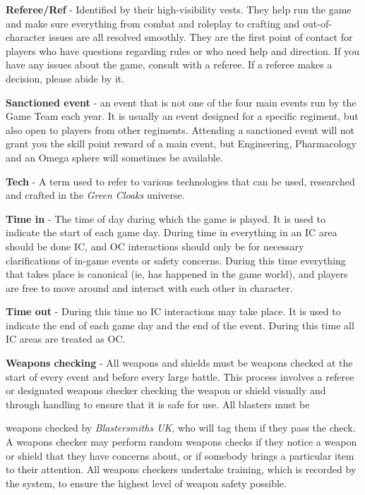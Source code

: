 \documentclass{scrbook}
\begin{document}
\textbf{Referee/Ref} - Identified by their high-visibility vests. They help run the game and make sure everything from combat and roleplay to crafting and out-of-character issues are all resolved smoothly. They are the first point of contact for players who have questions regarding rules or who need help and direction. If you have any issues about the game, consult with a referee. If a referee makes a decision, please abide by it.

\textbf{Sanctioned event} - an event that is not one of the four main events run by the Game Team each year. It is usually an event designed for a specific regiment, but also open to players from other regiments. Attending a sanctioned event will not grant you the skill point reward of a main event, but Engineering, Pharmacology and an Omega sphere will sometimes be available.

\textbf{Tech} - A term used to refer to various technologies that can be used, researched and crafted in the \textit{Green Cloaks} universe.

\textbf{Time in} - The time of day during which the game is played. It is used to indicate the start of each game day. During time in everything in an IC area should be done IC, and OC interactions should only be for necessary clarifications of in-game events or safety concerns. During this time everything that takes place is canonical (ie, has happened in the game world), and players are free to move around and interact with each other in character.

\textbf{Time out} - During this time no IC interactions may take place. It is used to indicate the end of each game day and the end of the event. During this time all IC areas are treated as OC.

\textbf{Weapons checking} - All weapons and shields must be weapons checked at the start of every event and before every large battle. This process involves a referee or designated weapons checker checking the weapon or shield visually and through handling to ensure that it is safe for use. All blasters must be

weapons checked by \textit{Blastersmiths UK}, who will tag them if they pass the check. A weapons checker may perform random weapons checks if they notice a weapon or shield that they have concerns about, or if somebody brings a particular item to their attention. All weapons checkers undertake training, which is recorded by the system, to ensure the highest level of weapon safety possible.
\end{document}
